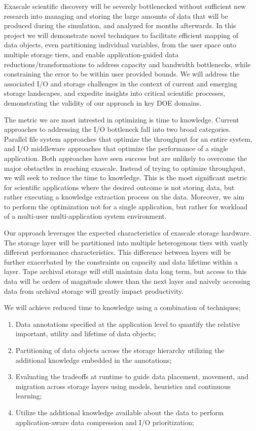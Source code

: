 Exascale scientific discovery will be severely bottlenecked without
sufficient new research into managing and storing the large amounts of data
that will be produced during the simulation, and analyzed for months
afterwards.  
%
In this project we will demonstrate novel techniques to
facilitate efficient mapping of data objects, even partitioning individual
variables, from the user space onto multiple storage tiers, and enable
application-guided data reductions/transformations to address capacity and
bandwidth bottlenecks, while constraining the error to be within user
provided bounds.
%
We will address the associated I/O and storage challenges in the context of
current and emerging storage landscapes, and expedite insights into critical
scientific processes, demonstrating the validity of our approach in key DOE
domains. 

The metric we are most intrested in optimizing is time to knowledge. Current
approaches to addressing the I/O bottleneck fall into two broad
categories. Parallel file system approaches that optimize the throughput for
an entire system, and I/O middleware approaches that optimize the
performance of a single application. Both approaches have seen success but
are unlikely to overcome the major obstactles in reaching exascale. Instead
of trying to optimize throughput, we will seek to reduce the time to
knowledge. This is the most significant metric for scientific applications
where the desired outcome is not storing data, but rather executing a
knowledge extraction process on the data. Moreover, we aim to perform the
optimization not for a single application, but rather for workload of a
multi-user multi-application system environment.

Our approach leverages the expected characteristics of exascale storage
hardware. The storage layer will be partitioned into multiple heterogenous
tiers with vastly different performance characteristics. This difference
between layers will be further exacerbated by the constraints on capacity
and data lifetime within a layer. Tape archival storage will still maintain
data long term, but access to this data will be orders of magnitude slower
than the next layer and naively accessing data from archival storage will
greatly impact productivity. 

We will achieve reduced time to knowledge using a combination of techniques;
\begin{enumerate}
\item Data annotations specified at the application level to quantify the
  relative important, utility and lifetime of data objects;
\item Partitioning of data objects across the storage hierarchy utilizing
  the additional knowledge embedded in the annotations;
\item Evaluating the tradeoffs at runtime to guide data placement, movement,
  and migration across storage layers using models, heuristics and continuous
  learning;
\item Utilize the additional knowledge available about the data to perform
  application-aware data compression and I/O prioritization;
\end{enumerate}


